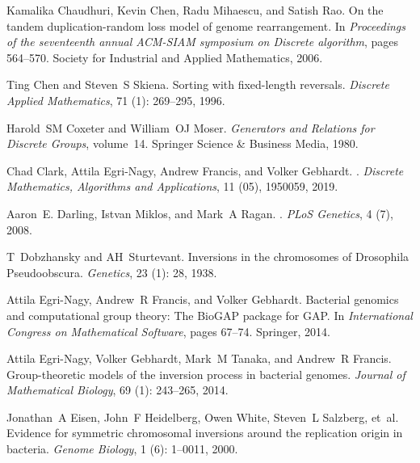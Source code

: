 \documentclass[12pt,a4paper]{amsart}
\numberwithin{equation}{section}
\begin{document}
\begin{thebibliography}{38}
Kamalika Chaudhuri, Kevin Chen, Radu Mihaescu, and Satish Rao.
\newblock On the tandem duplication-random loss model of genome rearrangement.
\newblock In \emph{Proceedings of the seventeenth annual ACM-SIAM symposium on
  Discrete algorithm}, pages 564--570. Society for Industrial and Applied
  Mathematics, 2006.

Ting Chen and Steven~S Skiena.
\newblock Sorting with fixed-length reversals.
\newblock \emph{Discrete Applied Mathematics}, 71 (1):
  269--295, 1996.

Harold~SM Coxeter and William~OJ Moser.
\newblock \emph{Generators and Relations for Discrete Groups}, volume~14.
\newblock Springer Science \& Business Media, 1980.

Chad Clark, Attila  Egri-Nagy, Andrew Francis, and Volker Gebhardt.
. 
\newblock \emph{Discrete Mathematics, Algorithms and Applications}, 11 (05), 1950059, 2019.

Aaron~E. Darling, Istvan Miklos, and Mark~A Ragan.
.
\newblock \emph{PLoS Genetics}, 4 (7), 2008.

T~Dobzhansky and AH~Sturtevant.
\newblock Inversions in the chromosomes of {D}rosophila {P}seudoobscura.
\newblock \emph{Genetics}, 23 (1): 28, 1938.

Attila Egri-Nagy, Andrew~R Francis, and Volker Gebhardt.
\newblock Bacterial genomics and computational group theory: The {BioGAP}
  package for {GAP}.
\newblock In \emph{International Congress on Mathematical Software}, pages
  67--74. Springer, 2014{}.

Attila Egri-Nagy, Volker Gebhardt, Mark~M Tanaka, and Andrew~R Francis.
\newblock Group-theoretic models of the inversion process in bacterial genomes.
\newblock \emph{Journal of Mathematical Biology}, 69 (1):
  243--265, 2014{}.

Jonathan~A Eisen, John~F Heidelberg, Owen White, Steven~L Salzberg, et~al.
\newblock Evidence for symmetric chromosomal inversions around the replication
  origin in bacteria.
\newblock \emph{Genome Biology}, 1 (6): 1--0011, 2000.


\end{thebibliography}
\end{document}
